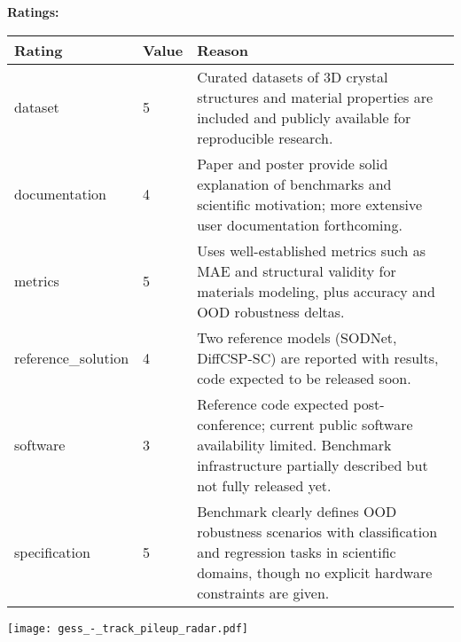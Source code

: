 {{{\bf Ratings:} ~ \\

\begin{tabular}{p{} p{} p{}}
\hline
Rating & Value & Reason \\
\hline
dataset & 5 & Curated datasets of 3D crystal structures and material properties are included and
publicly available for reproducible research.
 \\
documentation & 4 & Paper and poster provide solid explanation of benchmarks and scientific motivation;
more extensive user documentation forthcoming.
 \\
metrics & 5 & Uses well-established metrics such as MAE and structural validity for materials modeling,
plus accuracy and OOD robustness deltas.
 \\
reference\_solution & 4 & Two reference models (SODNet, DiffCSP-SC) are reported with results, code expected
to be released soon.
 \\
software & 3 & Reference code expected post-conference; current public software availability limited.
Benchmark infrastructure partially described but not fully released yet.
 \\
specification & 5 & Benchmark clearly defines OOD robustness scenarios with classification and regression
tasks in scientific domains, though no explicit hardware constraints are given.
 \\
\hline
\end{tabular}

\texttt{[image: gess\_-\_track\_pileup\_radar.pdf]}
}}
\clearpage